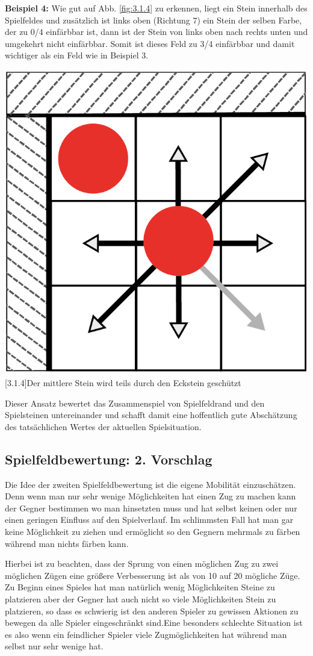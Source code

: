 \documentclass[12pt,a4paper,bibliography=totocnumbered,listof=totocnumbered]{scrartcl}
\begin{document}
    \textbf{Beispiel 4:} Wie gut auf Abb. \ref{fig:3.1.4} zu erkennen, liegt ein Stein innerhalb des Spielfeldes und zusätzlich ist links oben (Richtung 7) ein Stein der selben Farbe, der zu 0/4 einfärbbar ist, dann ist der Stein von links oben nach rechts unten und umgekehrt nicht einfärbbar. Somit ist dieses Feld zu 3/4 einfärbbar und damit wichtiger als ein Feld wie in Beispiel 3.\newline

   	\vspace{1em}
    \begin{minipage}{\linewidth}
    	\centering
    	\includegraphics[width=0.33\linewidth]{pics/Kapitel_3/Kapitel_3_pic4.png}
    	[3.1.4]{Der mittlere Stein wird teils durch den Eckstein geschützt}
    	\label{fig:3.1.4}
    \end{minipage}
	\vspace{1em}
	
	Dieser Ansatz bewertet das Zusammenspiel von Spielfeldrand und den Spielsteinen untereinander und schafft damit eine hoffentlich gute Abschätzung des tatsächlichen Wertes der aktuellen Spielsituation.

    \subsection{Spielfeldbewertung: 2. Vorschlag}

    Die Idee der zweiten Spielfeldbewertung ist die eigene Mobilität einzuschätzen. Denn wenn man nur sehr wenige Möglichkeiten hat einen Zug zu machen kann der Gegner bestimmen wo man hinsetzten muss und hat selbst keinen oder nur einen geringen Einfluss auf den Spielverlauf. Im schlimmsten Fall hat man gar keine Möglichkeit zu ziehen und ermöglicht so den Gegnern mehrmals zu färben während man nichts färben kann.

    \vspace{1em}


    Hierbei ist zu beachten, dass der Sprung von einen möglichen Zug zu zwei möglichen Zügen eine größere Verbesserung ist als von 10 auf 20 mögliche Züge.
    Zu Beginn eines Spieles hat man natürlich wenig Möglichkeiten Steine zu platzieren aber der Gegner hat auch nicht so viele Möglichkeiten Stein zu platzieren, so dass es schwierig ist den anderen Spieler zu gewissen Aktionen zu bewegen da alle Spieler eingeschränkt sind.Eine besonders schlechte Situation ist es also wenn ein feindlicher Spieler viele Zugmöglichkeiten hat während man selbst nur sehr wenige hat.
\end{document}
